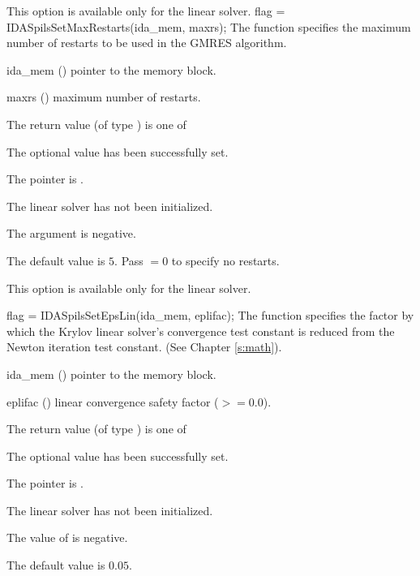 {{  {\warn}This option is available only for the {\idaspgmr} linear solver.
}
{
  flag = IDASpilsSetMaxRestarts(ida\_mem, maxrs);
}
{
  The function  specifies the maximum number of 
  restarts to be used in the GMRES algorithm.
}
{
  \begin{args}
  \item[ida\_mem] ()
    pointer to the {\ida} memory block.
  \item[maxrs] ()
    maximum number of restarts.
  \end{args}
}
{
  The return value  (of type ) is one of
  \begin{args}
  \item[\Id{IDASPILS\_SUCCESS}] 
    The optional value has been successfully set.
  \item[\Id{IDASPILS\_MEM\_NULL}]
    The  pointer is .
  \item[\Id{IDASPILS\_LMEM\_NULL}]
    The {\idaspils} linear solver has not been initialized.
  \item[\Id{IDASPILS\_ILL\_INPUT}]
    The  argument is negative.
  \end{args}
}
{
  The default value is $5$. Pass  $=0$ to specify no restarts.

  {\warn}This option is available only for the {\idaspgmr} linear solver.
}
{
  flag = IDASpilsSetEpsLin(ida\_mem, eplifac);
}
{
  The function  specifies the factor by
  which the Krylov linear solver's convergence test constant is reduced
  from the Newton iteration test constant. (See Chapter \ref{s:math}).
}
{
  \begin{args}
  \item[ida\_mem] ()
    pointer to the {\ida} memory block.
  \item[eplifac] ()
    linear convergence safety factor ($>= 0.0$).
  \end{args}
}
{
  The return value  (of type ) is one of
  \begin{args}
  \item[\Id{IDASPILS\_SUCCESS}] 
    The optional value has been successfully set.
  \item[\Id{IDASPILS\_MEM\_NULL}]
    The  pointer is .
  \item[\Id{IDASPILS\_LMEM\_NULL}]
    The {\idaspils} linear solver has not been initialized.
  \item[\Id{IDASPILS\_ILL\_INPUT}]
    The value of  is negative.
  \end{args}
}
{
  The default value is $0.05$.

}}
